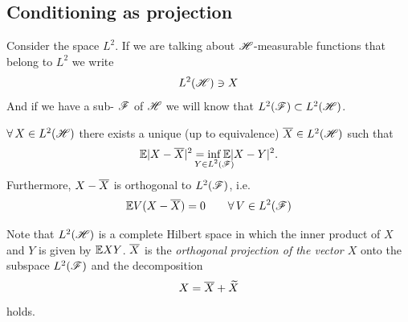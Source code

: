 \documentclass{report}
\begin{document}
\subsection{Conditioning as projection}
\begin{notation}
	Consider the space $L^{2}$. If we are talking about $\mathscr{H}$-measurable functions that belong to $L^{2}$ we write 
	\[L^{2}(\mathscr{H})\ni X\]
	And if we have a sub-\sa{} $\mathscr{F}$ of $\mathscr{H}$ we will know that $L^{2}(\mathscr{F})\subset L^{2}(\mathscr{H})$.
\end{notation}
\begin{theorem}
	$\forall\, X\in L^{2}(\mathscr{H})$ there exists a unique (up to equivalence) $\overline{X}\in L^{2}(\mathscr{H})$ such that 
	\[\ev|X-\xbar|^{2}=\inf_{\mathclap{Y\in L^{2}(\F)}}\ev|X-Y|^{2}.\]
	Furthermore, $	X-\overline{X}$ is orthogonal to $L^{2}(\mathscr{F})$, i.e.
	\begin{equation*}
		\mathbb{E} V(X-\overline{X})=0\qquad\forall\, V\in L^{2}(\mathscr{F})
	\end{equation*}
\end{theorem}
Note that $L^{2}(\mathscr{H})$ is a complete Hilbert space in which the inner product of $X$ and $Y$ is given by $\mathbb{E} XY$.
$\overline{X}$ is the \emph{orthogonal projection of the vector $X$} onto the subspace $L^{2}(\mathscr{F})$ and the decomposition 
\[X=\overline{X}+\widetilde{X}\]
holds.
\end{document}
